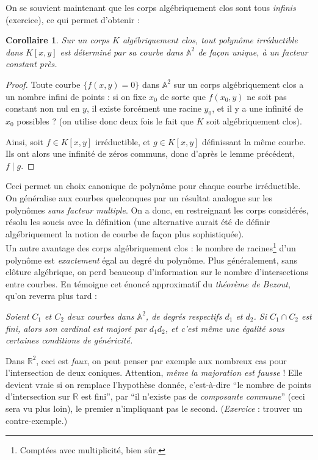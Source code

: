 \documentclass[a4paper, 11pt]{article}
\newtheorem{corollaire}[théorème]{Corollaire}
\theoremstyle{definition}
\newcommand{\real}{\mathbb{R}}
\newcommand{\aff}{\mathbb{A}}
\begin{document}
On se souvient maintenant que les corps algébriquement clos sont tous
\emph{infinis} (exercice), ce qui permet d'obtenir :
\begin{corollaire}
  Sur un corps $K$ algébriquement clos, tout polynôme
  \emph{irréductible} dans $K[x,y]$ est déterminé par sa courbe dans
  $\aff^2$ de façon unique, à un facteur constant près.
\end{corollaire}
\begin{proof}
  Toute courbe $\{f(x,y)=0\}$ dans $\aff^2$ sur un corps
  algébriquement clos a un nombre infini de points : si on fixe $x_0$
  de sorte que $f(x_0,y)$ ne soit pas constant non nul en $y$, il
  existe forcément une racine $y_0$, et il y a une infinité de $x_0$
  possibles ? (on utilise donc deux fois le fait que $K$ soit
  algébriquement clos).

  Ainsi, soit $f \in K[x,y]$ irréductible, et $g \in K[x,y]$
  définissant la même courbe. Ils ont alors une infinité de zéros
  communs, donc d'après le lemme précédent, $f \mid g$.
\end{proof}

Ceci permet un choix canonique de polynôme pour chaque courbe
irréductible. On généralise aux courbes quelconques par un résultat
analogue sur les polynômes \emph{sans facteur multiple}. On a donc, en
restreignant les corps considérés, résolu les soucis avec la
définition (une alternative aurait été de définir algébriquement la
notion de courbe de façon plus sophistiquée).\\

Un autre avantage des corps algébriquement clos : le nombre de
racines\footnote{Comptées avec multiplicité, bien sûr.} d'un polynôme
est \emph{exactement} égal au degré du polynôme. Plus généralement,
sans clôture algébrique, on perd beaucoup d'information sur le nombre
d'intersections entre courbes. En témoigne cet énoncé approximatif du
\emph{théorème de Bezout}, qu'on reverra plus tard :

\textit{Soient $C_1$ et $C_2$ deux courbes dans $\aff^2$, de degrés
  respectifs $d_1$ et $d_2$. Si $C_1 \cap C_2$ est fini, alors son
  cardinal est majoré par $d_1 d_2$, et c'est même une égalité sous
  certaines conditions de généricité.}

Dans $\real^2$, ceci est \emph{faux}, on peut penser par exemple aux
nombreux cas pour l'intersection de deux coniques. Attention,
\emph{même la majoration est fausse} ! Elle devient vraie si on
remplace l'hypothèse donnée, c'est-à-dire \enquote{le nombre de points
  d'intersection sur $\real$ est fini}, par \enquote{il n'existe pas
  de \emph{composante commune}} (ceci sera vu plus loin), le premier
n'impliquant pas le second. (\textit{Exercice} : trouver un contre-exemple.)\\
\end{document}
